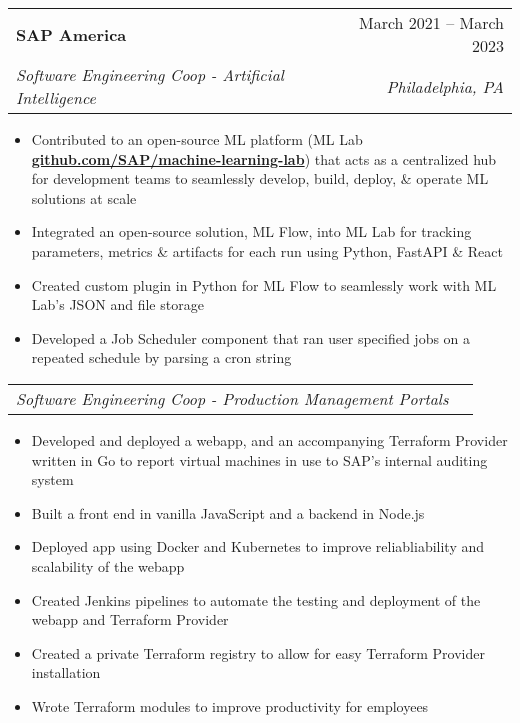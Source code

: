 \documentclass[letterpaper,11pt]{article}
\makeatletter
\newcommand{\resumeItem}[1]{
  \item\small{
    {#1 \vspace{-2pt}}
  }
}
\newcommand{\resumeSubheading}[4]{
  \vspace{-2pt}\item
    \begin{tabular*}{0.97\textwidth}[t]{l@{\extracolsep{\fill}}r}
      \textbf{#1} & #2 \\
      \textit{\small#3} & \textit{\small #4} \\
    \end{tabular*}\vspace{-7pt}
}
\newcommand{\resumeSubSubheading}[2]{
    \item
    \begin{tabular*}{0.97\textwidth}{l@{\extracolsep{\fill}}r}
      \textit{\small#1} & \textit{\small #2} \\
    \end{tabular*}\vspace{-7pt}
}
\newcommand{\resumeItemListStart}{\begin{itemize}}
\newcommand{\resumeItemListEnd}{\end{itemize}\vspace{-5pt}}
\makeatother
\begin{document}
      
    \resumeSubheading
    {SAP America}{March 2021 -- March 2023}
    {Software Engineering Coop - Artificial Intelligence}{Philadelphia, PA}
    \resumeItemListStart
      \resumeItem {Contributed to an open-source ML platform (ML Lab \textbf{\href{https://github.com/SAP/machine-learning-lab}{github.com/SAP/machine-learning-lab}}) that acts as a centralized hub for development teams to seamlessly develop, build, deploy, \& operate ML solutions at scale}
      \resumeItem {Integrated an open-source solution, ML Flow, into ML Lab for tracking parameters, metrics \& artifacts for each run using Python, FastAPI \& React}
      \resumeItem {Created custom plugin in Python for ML Flow to seamlessly work with ML Lab's JSON and file storage}
      \resumeItem {Developed a Job Scheduler component that ran user specified jobs on a repeated schedule by parsing a cron string}
    \resumeItemListEnd
    
    \resumeSubSubheading
    {Software Engineering Coop - Production Management Portals}{}
    \resumeItemListStart
      \resumeItem {Developed and deployed a webapp, and an accompanying Terraform Provider written in Go to report virtual machines in use to SAP's internal auditing system}
      \resumeItem {Built a front end in vanilla JavaScript and a backend in Node.js}
      \resumeItem {Deployed app using Docker and Kubernetes to improve reliabliability and scalability of the webapp}
      \resumeItem {Created Jenkins pipelines to automate the testing and deployment of the webapp and Terraform Provider}
      \resumeItem {Created a private Terraform registry to allow for easy Terraform Provider installation}
      \resumeItem {Wrote Terraform modules to improve productivity for employees}
    \resumeItemListEnd
    
\end{document}
